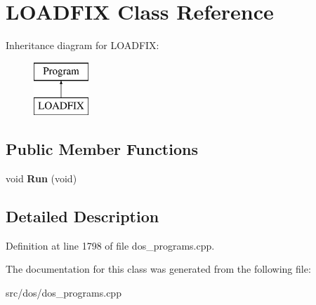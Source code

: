 \hypertarget{classLOADFIX}{\section{L\-O\-A\-D\-F\-I\-X Class Reference}
\label{classLOADFIX}
}
Inheritance diagram for L\-O\-A\-D\-F\-I\-X\-:\begin{figure}[H]
\begin{center}
\leavevmode
\includegraphics[height=2.000000cm]{classLOADFIX}
\end{center}
\end{figure}
\subsection*{Public Member Functions}
\begin{DoxyCompactItemize}
\item 
\hypertarget{classLOADFIX_a2edbc9814c14ed39a0410473df0bcc36}{void {\bfseries Run} (void)}\label{classLOADFIX_a2edbc9814c14ed39a0410473df0bcc36}

\end{DoxyCompactItemize}


\subsection{Detailed Description}


Definition at line 1798 of file dos\-\_\-programs.\-cpp.



The documentation for this class was generated from the following file\-:\begin{DoxyCompactItemize}
\item 
src/dos/dos\-\_\-programs.\-cpp\end{DoxyCompactItemize}
